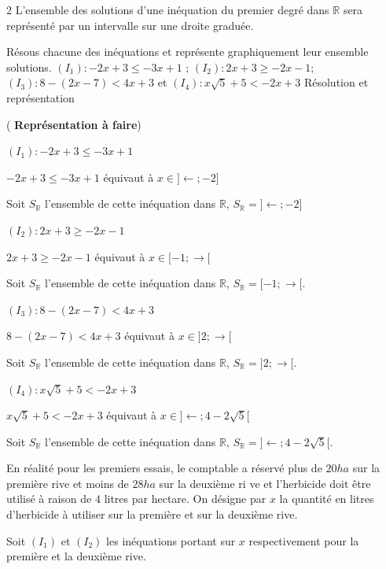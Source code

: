 \begin{multicols*}{2}
{  		 L'ensemble des solutions d'une inéquation du premier degré dans $\mathbb{R}$ sera représenté par un intervalle sur une droite graduée.}
  	
  	
  	Résous chacune des inéquations et représente graphiquement leur ensemble solutions.
  	$(I_{1}): -2x+3\leqslant-3x+1$ ; $(I_{2}): 2x+3\geqslant-2x-1$; $(I_{3}): 8-(2x-7)< 4x+3$ et $(I_{4}): x\sqrt{5}+5<-2x+3$
  	\dure
  	\resul
  	Résolution et représentation
  	
  	(\textbf{ Représentation à faire}) 
  	
  	 $(I_{1}): -2x+3\leqslant-3x+1$
  	
  	$-2x+3\leqslant-3x+1$ équivaut à $x\in ]\leftarrow;-2 ]$ 
  	
  	Soit $S_{\mathbb{R}}$ l'ensemble de cette inéquation dans $\mathbb{R}$, $S_{\mathbb{R}}=]\leftarrow;-2 ]$
  	
  	 $(I_{2}): 2x+3\geqslant-2x-1$
  	
  	$2x+3\geqslant-2x-1$ équivaut à $x\in [-1; \rightarrow[  $ 
  	
  	Soit $S_{\mathbb{R}}$ l'ensemble de cette inéquation dans $\mathbb{R}$, $S_{\mathbb{R}}=[-1; \rightarrow[$.
  	
  	 $(I_{3}): 8-(2x-7)< 4x+3$
  	
  	$8-(2x-7)< 4x+3$ équivaut à $x\in ]2;\rightarrow[ $ 
  	
  	Soit $S_{\mathbb{R}}$ l'ensemble de cette inéquation dans $\mathbb{R}$, $S_{\mathbb{R}}=]2;\rightarrow[$.
  	
  	 $(I_{4}): x\sqrt{5}+5<-2x+3$
  	
  	$x\sqrt{5}+5<-2x+3$ équivaut à $x\in ]\leftarrow;4-2\sqrt{5}[ $ 
  	
  	Soit $S_{\mathbb{R}}$ l'ensemble de cette inéquation dans $\mathbb{R}$, $S_{\mathbb{R}}=]\leftarrow;4-2\sqrt{5}[$.
  	
  	
  	
  	En réalité pour les premiers essais, le comptable a réservé plus de $20 ha$ sur la première rive et moins de $28 ha$ sur la deuxième ri	ve et l'herbicide doit être utilisé à raison de 4 litres par hectare. On désigne par $x$ la quantité en litres d'herbicide à utiliser sur la première et sur la deuxième rive. 
  	
  	Soit $(I_{1})$ et $(I_{2})$ les inéquations portant sur $x$ respectivement pour la première et la deuxième rive.
  	

\end{multicols*}
